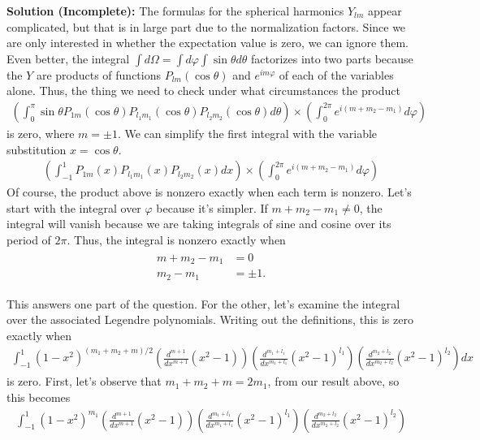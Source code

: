 \documentclass{book}
\begin{document}
    \textbf{Solution (Incomplete):} The formulas for the spherical harmonics $Y_{lm}$ appear complicated, but that is in large part due to the normalization factors. Since we are only interested in whether the expectation value is zero, we can ignore them. Even better, the integral $\int d\Omega = \int d\varphi \int \sin\theta d\theta$ factorizes into two parts because the $Y$ are products of functions $P_{lm}(\cos\theta)$ and $e^{im\varphi}$ of each of the variables alone. Thus, the thing we need to check under what circumstances the product
    \begin{align}
        \left(\int_0^\pi \sin \theta P_{1m}(\cos\theta) P_{l_1 m_1}(\cos\theta) P_{l_2 m_2}(\cos\theta)d\theta\right) \times \left(\int_0^{2\pi} e^{i(m + m_2 - m_1)}d\varphi\right)
    \end{align}
    is zero, where $m = \pm 1$. We can simplify the first integral with the variable substitution $x = \cos\theta$.
    \begin{align}
        \left(\int_{-1}^1  P_{1m}(x) P_{l_1 m_1}(x) P_{l_2 m_2}(x)dx\right) \times \left(\int_0^{2\pi} e^{i(m + m_2 - m_1)}d\varphi\right)
    \end{align}
    Of course, the product above is nonzero exactly when each term is nonzero. Let's start with the integral over $\varphi$ because it's simpler. If $m +m_2 - m_1 \neq 0 $, the integral will vanish because we are taking integrals of sine and cosine over its period of $2\pi$. Thus, the integral is nonzero exactly when
    \begin{align}
    \begin{aligned}
        m + m_2 - m_1 &= 0 \\
        m_2 - m_1 &= \pm 1.
    \end{aligned}
    \end{align}

    This answers one part of the question. For the other, let's examine the integral over the associated Legendre polynomials. Writing out the definitions, this is zero exactly when
    \begin{align}
        \int_{-1}^1(1-x^2)^{(m_1 + m_2 + m)/2}\left(\frac{d^{m+1}}{dx^{m+1}}(x^2 - 1)\right)\left(\frac{d^{m_1+l_1}}{dx^{m_1+l_1}}(x^2 - 1)^{l_1}\right)\left(\frac{d^{m_2+l_2}}{dx^{m_2+l_2}}(x^2 - 1)^{l_2}\right) dx
    \end{align}
    is zero. First, let's observe that $m_1 + m_2 + m = 2 m_1$, from our result above, so this becomes
    \begin{align}
        \int_{-1}^1 (1-x^2)^{m_1} \left(\frac{d^{m+1}}{dx^{m+1}}(x^2 - 1)\right)\left(\frac{d^{m_1+l_1}}{dx^{m_1+l_1}}(x^2 - 1)^{l_1}\right)\left(\frac{d^{m_2+l_2}}{dx^{m_2+l_2}}(x^2 - 1)^{l_2}\right)
    \end{align}
    
\end{document}
